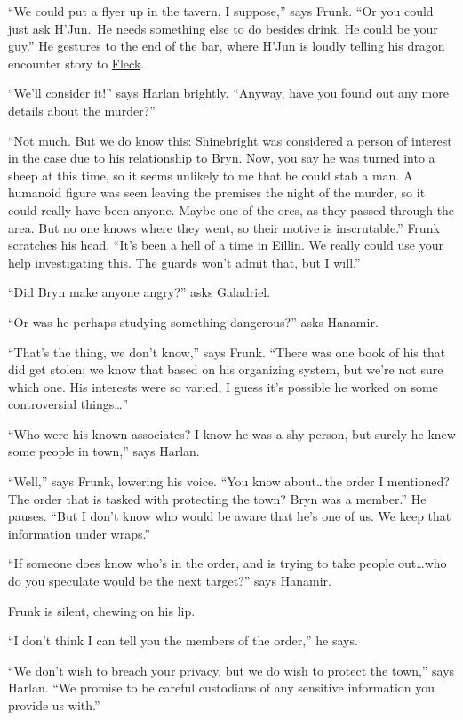 \documentclass[smalldemyvopaper,11pt,twoside,onecolumn,openright,extrafontsizes]{memoir}
\begin{document}
``We could put a flyer up in the tavern, I suppose,'' says Frunk. ``Or
you could just ask H'Jun.~He needs something else to do besides drink.
He could be your guy.'' He gestures to the end of the bar, where H'Jun
is loudly telling his dragon encounter story to
\href{/characters/fleck/}{Fleck}.

``We'll consider it!'' says Harlan brightly. ``Anyway, have you found
out any more details about the murder?''

``Not much. But we do know this: Shinebright was considered a person of
interest in the case due to his relationship to Bryn. Now, you say he
was turned into a sheep at this time, so it seems unlikely to me that he
could stab a man. A humanoid figure was seen leaving the premises the
night of the murder, so it could really have been anyone. Maybe one of
the orcs, as they passed through the area. But no one knows where they
went, so their motive is inscrutable.'' Frunk scratches his head. ``It's
been a hell of a time in Eillin. We really could use your help
investigating this. The guards won't admit that, but I will.''

``Did Bryn make anyone angry?'' asks Galadriel.

``Or was he perhaps studying something dangerous?'' asks Hanamir.

``That's the thing, we don't know,'' says Frunk. ``There was one book of
his that did get stolen; we know that based on his organizing system,
but we're not sure which one. His interests were so varied, I guess it's
possible he worked on some controversial things\ldots{}''

``Who were his known associates? I know he was a shy person, but surely
he knew some people in town,'' says Harlan.

``Well,'' says Frunk, lowering his voice. ``You know about\ldots the
order I mentioned? The order that is tasked with protecting the town?
Bryn was a member.'' He pauses. ``But I don't know who would be aware
that he's one of us. We keep that information under wraps.''

``If someone does know who's in the order, and is trying to take people
out\ldots who do you speculate would be the next target?'' says Hanamir.

Frunk is silent, chewing on his lip.

``I don't think I can tell you the members of the order,'' he says.

``We don't wish to breach your privacy, but we do wish to protect the
town,'' says Harlan. ``We promise to be careful custodians of any
sensitive information you provide us with.''
\end{document}

